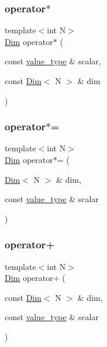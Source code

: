 \subsubsection{\texorpdfstring{operator$\ast$}{operator*}\hspace{0.1cm}{\footnotesize\ttfamily [2/2]}}
{\footnotesize\ttfamily template$<$int N$>$ \\
\hyperlink{structbc_1_1Dim}{Dim} operator$\ast$ (\begin{DoxyParamCaption}\item[{const \hyperlink{structbc_1_1Dim_af59ff554825273cf6bd9619b2c78c196}{value\+\_\+type} \&}]{scalar,  }\item[{const \hyperlink{structbc_1_1Dim}{Dim}$<$ N $>$ \&}]{dim }\end{DoxyParamCaption})\hspace{0.3cm}{\ttfamily [friend]}}

\mbox{\label{structbc_1_1Dim_a94764e1d867db961979f0edf57544011}} 
\subsubsection{\texorpdfstring{operator$\ast$=}{operator*=}}
{\footnotesize\ttfamily template$<$int N$>$ \\
\hyperlink{structbc_1_1Dim}{Dim} operator$\ast$= (\begin{DoxyParamCaption}\item[{\hyperlink{structbc_1_1Dim}{Dim}$<$ N $>$ \&}]{dim,  }\item[{const \hyperlink{structbc_1_1Dim_af59ff554825273cf6bd9619b2c78c196}{value\+\_\+type} \&}]{scalar }\end{DoxyParamCaption})\hspace{0.3cm}{\ttfamily [friend]}}

\mbox{\label{structbc_1_1Dim_ab350b29535281835935cc1c076868570}} 
\subsubsection{\texorpdfstring{operator+}{operator+}\hspace{0.1cm}{\footnotesize\ttfamily [1/2]}}
{\footnotesize\ttfamily template$<$int N$>$ \\
\hyperlink{structbc_1_1Dim}{Dim} operator+ (\begin{DoxyParamCaption}\item[{const \hyperlink{structbc_1_1Dim}{Dim}$<$ N $>$ \&}]{dim,  }\item[{const \hyperlink{structbc_1_1Dim_af59ff554825273cf6bd9619b2c78c196}{value\+\_\+type} \&}]{scalar }\end{DoxyParamCaption})\hspace{0.3cm}{\ttfamily [friend]}}

